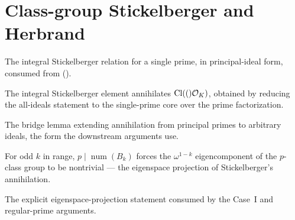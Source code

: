 \section{Class-group Stickelberger and Herbrand}\label{sec:stickherbrand}

\begin{definition}\label{ext:stksingle}
  \leanok
  The integral Stickelberger relation for a single prime, in principal-ideal form,
  consumed from 
  ().
\end{definition}

\begin{theorem}\label{thm:stkannih}
  \leanok
  The integral Stickelberger element annihilates $\mathrm{Cl}(()\mathcal{O}_K)$, obtained by reducing
  the all-ideals statement to the single-prime core over the prime factorization.
\end{theorem}

\begin{theorem}\label{thm:stkideal}
  \leanok
  The bridge lemma extending annihilation from principal primes to arbitrary
  ideals, the form the downstream arguments use.
\end{theorem}

\begin{theorem}\label{thm:herbrand}
  \leanok
  For odd $k$ in range, $p \mid \operatorname{num}(B_k)$ forces the $\omega^{1-k}$
  eigencomponent of the $p$-class group to be nontrivial --- the eigenspace
  projection of Stickelberger's annihilation.
\end{theorem}

\begin{theorem}\label{thm:herbrandeigen}
  \leanok
  The explicit eigenspace-projection statement consumed by the Case~I and
  regular-prime arguments.
\end{theorem}

